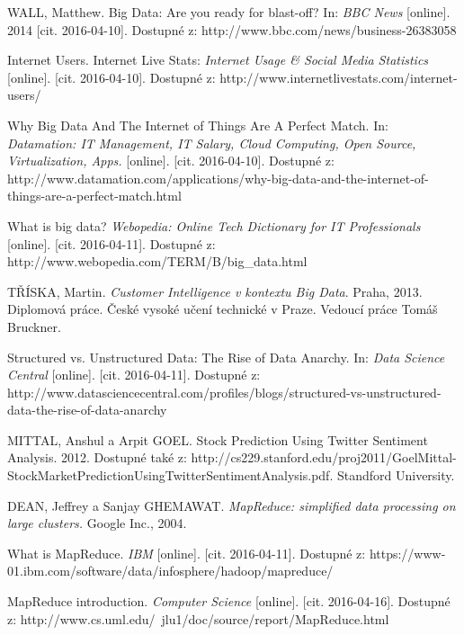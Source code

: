 \documentclass[thesis=B,czech]{FITthesis}[2012/06/26]
\begin{document}
\begin{thebibliography}{1}

 WALL, Matthew. Big Data: Are you ready for blast-off? In: \textit{BBC News} [online]. 2014 [cit. 2016-04-10]. Dostupné z: http://www.bbc.com/news/business-26383058

 Internet Users. Internet Live Stats: \textit{Internet Usage \& Social Media Statistics} [online]. [cit. 2016-04-10]. Dostupné z: http://www.internetlivestats.com/internet-users/

 Why Big Data And The Internet of Things Are A Perfect Match. In: \textit{Datamation: IT Management, IT Salary, Cloud Computing, Open Source, Virtualization, Apps.} [online]. [cit. 2016-04-10]. Dostupné z: http://www.datamation.com/applications/why-big-data-and-the-internet-of-things-are-a-perfect-match.html

 What is big data? \textit{Webopedia: Online Tech Dictionary for IT Professionals} [online]. [cit. 2016-04-11]. Dostupné z: http://www.webopedia.com/TERM/B/big\_data.html

 TŘÍSKA, Martin. \textit{Customer Intelligence v kontextu Big Data}. Praha, 2013. Diplomová práce. České vysoké učení technické v Praze. Vedoucí práce Tomáš Bruckner.

Structured vs. Unstructured Data: The Rise of Data Anarchy. In: \textit{Data Science Central} [online]. [cit. 2016-04-11]. Dostupné z: http://www.datasciencecentral.com/profiles/blogs/structured-vs-unstructured-data-the-rise-of-data-anarchy

MITTAL, Anshul a Arpit GOEL. Stock Prediction Using Twitter Sentiment Analysis. 2012. Dostupné také z: http://cs229.stanford.edu/proj2011/GoelMittal-StockMarketPredictionUsingTwitterSentimentAnalysis.pdf. Standford University.

DEAN, Jeffrey a Sanjay GHEMAWAT. \textit{MapReduce: simplified data processing on large clusters.} Google Inc., 2004.

What is MapReduce. \textit{IBM} [online]. [cit. 2016-04-11]. Dostupné z: https://www-01.ibm.com/software/data/infosphere/hadoop/mapreduce/

MapReduce introduction. \textit{Computer Science} [online]. [cit. 2016-04-16]. Dostupné z: http://www.cs.uml.edu/~jlu1/doc/source/report/MapReduce.html


\end{thebibliography}
\end{document}
